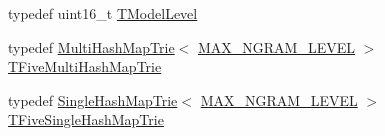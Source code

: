 \begin{DoxyCompactItemize}
\item 
typedef uint16\+\_\+t \hyperlink{namespaceuva_1_1smt_1_1tries_a26064146e98856c7c4185efab0e61a36}{T\+Model\+Level}
\item 
typedef \hyperlink{classuva_1_1smt_1_1tries_1_1_multi_hash_map_trie}{Multi\+Hash\+Map\+Trie}$<$ \hyperlink{namespaceuva_1_1smt_1_1tries_ad08b42e58134f38a6aa8af8591035ab9}{M\+A\+X\+\_\+\+N\+G\+R\+A\+M\+\_\+\+L\+E\+V\+E\+L} $>$ \hyperlink{namespaceuva_1_1smt_1_1tries_a0916c3aed3745b55a6ea956b697d0193}{T\+Five\+Multi\+Hash\+Map\+Trie}
\item 
typedef \hyperlink{classuva_1_1smt_1_1tries_1_1_single_hash_map_trie}{Single\+Hash\+Map\+Trie}$<$ \hyperlink{namespaceuva_1_1smt_1_1tries_ad08b42e58134f38a6aa8af8591035ab9}{M\+A\+X\+\_\+\+N\+G\+R\+A\+M\+\_\+\+L\+E\+V\+E\+L} $>$ \hyperlink{namespaceuva_1_1smt_1_1tries_a193f8f81788ff26920b4a93a34042d0b}{T\+Five\+Single\+Hash\+Map\+Trie}
\end{DoxyCompactItemize}
